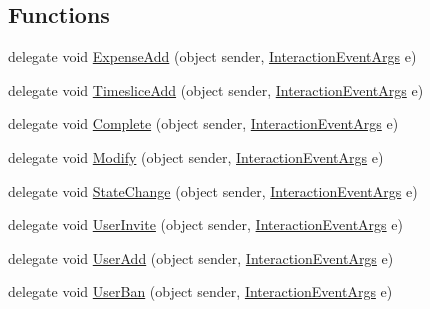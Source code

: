 \subsection*{Functions}
\begin{DoxyCompactItemize}
\item 
delegate void \hyperlink{namespace_plex_byte_1_1_mo_cap_1_1_interactions_a7c03c08c6f524b34193985c455985f1f}{Expense\+Add} (object sender, \hyperlink{class_plex_byte_1_1_mo_cap_1_1_interactions_1_1_interaction_event_args}{Interaction\+Event\+Args} e)
\item 
delegate void \hyperlink{namespace_plex_byte_1_1_mo_cap_1_1_interactions_a600557b92ababd90f6a91c524998565a}{Timeslice\+Add} (object sender, \hyperlink{class_plex_byte_1_1_mo_cap_1_1_interactions_1_1_interaction_event_args}{Interaction\+Event\+Args} e)
\item 
delegate void \hyperlink{namespace_plex_byte_1_1_mo_cap_1_1_interactions_ac81ac3321ab2b018c75ad2c18ec15b9e}{Complete} (object sender, \hyperlink{class_plex_byte_1_1_mo_cap_1_1_interactions_1_1_interaction_event_args}{Interaction\+Event\+Args} e)
\item 
delegate void \hyperlink{namespace_plex_byte_1_1_mo_cap_1_1_interactions_a490186f613e46adce26244f3b2c78a58}{Modify} (object sender, \hyperlink{class_plex_byte_1_1_mo_cap_1_1_interactions_1_1_interaction_event_args}{Interaction\+Event\+Args} e)
\item 
delegate void \hyperlink{namespace_plex_byte_1_1_mo_cap_1_1_interactions_af2ff213e81451f96fc74bfad114cecde}{State\+Change} (object sender, \hyperlink{class_plex_byte_1_1_mo_cap_1_1_interactions_1_1_interaction_event_args}{Interaction\+Event\+Args} e)
\item 
delegate void \hyperlink{namespace_plex_byte_1_1_mo_cap_1_1_interactions_aef92e5d1e9d0a246188e890e95317f08}{User\+Invite} (object sender, \hyperlink{class_plex_byte_1_1_mo_cap_1_1_interactions_1_1_interaction_event_args}{Interaction\+Event\+Args} e)
\item 
delegate void \hyperlink{namespace_plex_byte_1_1_mo_cap_1_1_interactions_a16841bb191709e7941fc1acb4d96f24f}{User\+Add} (object sender, \hyperlink{class_plex_byte_1_1_mo_cap_1_1_interactions_1_1_interaction_event_args}{Interaction\+Event\+Args} e)
\item 
delegate void \hyperlink{namespace_plex_byte_1_1_mo_cap_1_1_interactions_a7dea125552945356069febe97eb72332}{User\+Ban} (object sender, \hyperlink{class_plex_byte_1_1_mo_cap_1_1_interactions_1_1_interaction_event_args}{Interaction\+Event\+Args} e)

\end{DoxyCompactItemize}
